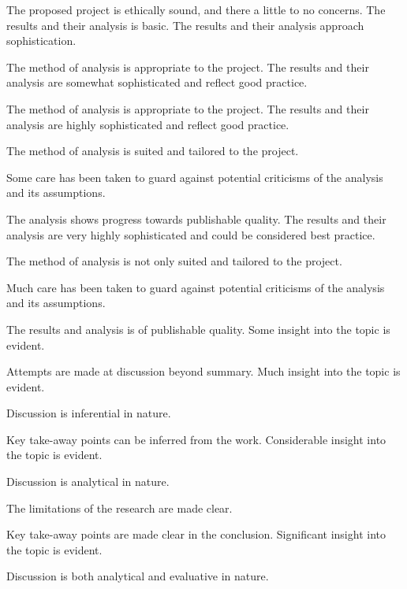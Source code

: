 \begin{markingrubric}
        \par		The proposed project is ethically sound, and there a little to no concerns.
%  
        \grade\fail 
        \grade 		The results and their analysis is basic.
        \grade 		The results and their analysis approach sophistication.
        \par 		The method of analysis is appropriate to the project.
        \grade 		The results and their analysis are somewhat sophisticated and reflect good practice.
        \par 		The method of analysis is appropriate to the project.
        \grade 		The results and their analysis are highly sophisticated and reflect good practice.
        \par 		The method of analysis is suited and tailored to the project.
       \par 		Some care has been taken to guard against potential criticisms of the analysis and its assumptions.
        \par		The analysis shows progress towards publishable quality.
        \grade 		The results and their analysis are very highly sophisticated and could be considered best practice.
        \par 		The method of analysis is not only suited and tailored to the project.
        \par 		Much care has been taken to guard against potential criticisms of the analysis and its assumptions.
        \par		The results and analysis is of publishable quality.
%
        \grade\fail 
        \grade		Some insight into the topic is evident.
        \par		Attempts are made at discussion beyond summary.
        \grade		Much insight into the topic is evident.
        \par		Discussion is inferential in nature.
        \par		Key take-away points can be inferred from the work.
        \grade		Considerable insight into the topic is evident.
        \par		Discussion is analytical in nature.
        \par		The limitations of the research are made clear.
        \par		Key take-away points are made clear in the conclusion.
        \grade		Significant  insight into the topic is evident.
        \par		Discussion is both analytical and evaluative in nature.

\end{markingrubric}
